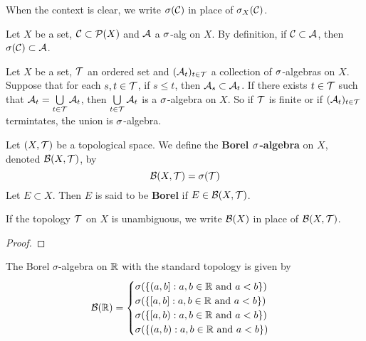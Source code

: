 \documentclass{book}
\begin{document}
	\begin{note}
		When the context is clear, we write $\sigma(\mathcal{C})$ in place of $\sigma_X(\mathcal{C})$.
	\end{note}
	
	\begin{note}
		Let $X$ be a set, $\mathcal{C} \subset \mathcal{P}(X)$ and $\mathcal{A}$ a $\sigma$-alg on $X$. By definition, if $\mathcal{C} \subset \mathcal{A}$, then $\sigma(\mathcal{C}) \subset \mathcal{A}$.
	\end{note}
	
	\begin{note}
		Let $X$ be a set, $\mathcal{T}$ an ordered set and $(\mathcal{A}_t)_{t\in \mathcal{T}}$ a collection of $\sigma$-algebras on $X$. Suppose that for each $s,t \in \mathcal{T}$, if $s \leq t$, then $\mathcal{A}_s \subset \mathcal{A}_t$. If there exists $t \in \mathcal{T}$ such that $\mathcal{A}_t = \bigcup\limits_{t \in \mathcal{T}}\mathcal{A}_t$, then $\bigcup\limits_{t \in \mathcal{T}}\mathcal{A}_t$ is a $\sigma$-algebra on $X$. So if $\mathcal{T}$ is finite or if $(\mathcal{A}_t)_{t \in \mathcal{T}}$ termintates, the union is $\sigma$-algebra.
	\end{note}
	
	\begin{defn}   
		Let $(X,\mathcal{T})$ be a topological space. We define the \textbf{Borel $\sigma$-algebra} on $X$, denoted $\mathcal{B}(X, \mathcal{T})$, by 
		$$\mathcal{B}(X, \mathcal{T}) = \sigma(\mathcal{T})$$  
		Let $E \subset X$. Then $E$ is said to be \textbf{Borel} if $E \in \mathcal{B}(X, \mathcal{T})$.
	\end{defn}

	\begin{note}
		If the topology $\mathcal{T}$ on $X$ is unambiguous, we write $\mathcal{B}(X)$ in place of $\mathcal{B}(X, \mathcal{T})$.
	\end{note}

	\begin{ex}  
		\tcr{Show that $\MB(\ol{\R}) = \sig((\al, \infty]: \al \in \R)$ and similar}
	\end{ex}

	\begin{proof}
	\end{proof}
	
	\begin{ex}  
		The Borel $\sigma$-algebra on $\mathbb{R}$ with the standard topology is given by 
		\[
		\mathcal{B}(\mathbb{R}) =
		\begin{cases}
			\sigma(\{(a,b]:a,b \in \mathbb{R} \text{ and } a<b\}) \\
			\sigma(\{[a,b]:a,b \in \mathbb{R} \text{ and } a<b\}) \\
			\sigma(\{[a,b):a,b \in \mathbb{R} \text{ and } a<b\}) \\
			\sigma(\{(a,b):a,b \in \mathbb{R} \text{ and } a<b\}) \\
		\end{cases}
		\]
	\end{ex}
	
\end{document}
